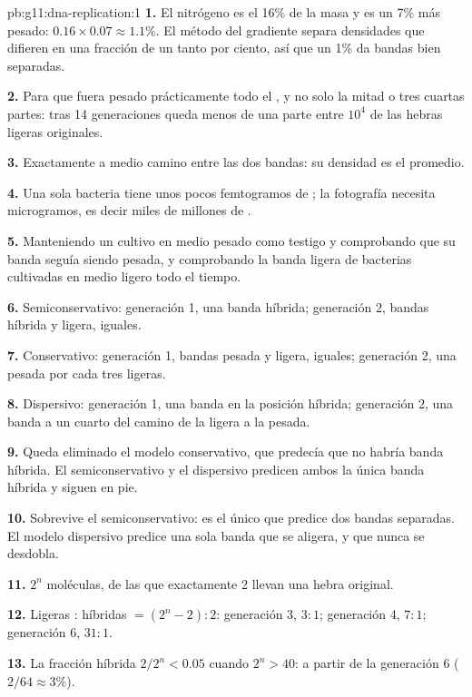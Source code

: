 \begin{solution}{pb:g11:dna-replication:1}
\textbf{1.} El nitrógeno es el 16\% de la masa y es un 7\% más pesado:
$0.16 \times 0.07 \approx 1.1\%$. El método del gradiente separa
densidades que difieren en una fracción de un tanto por ciento, así que
un 1\% da bandas bien separadas.

\textbf{2.} Para que fuera pesado prácticamente todo el , y no solo
la mitad o tres cuartas partes: tras 14 generaciones queda menos de una
parte entre $10^4$ de las hebras ligeras originales.

\textbf{3.} Exactamente a medio camino entre las dos bandas: su
densidad es el promedio.

\textbf{4.} Una sola bacteria tiene unos pocos femtogramos de ; la
fotografía necesita microgramos, es decir miles de millones de .

\textbf{5.} Manteniendo un cultivo en medio pesado como testigo y
comprobando que su banda seguía siendo pesada, y comprobando la banda
ligera de bacterias cultivadas en medio ligero todo el tiempo.

\textbf{6.} Semiconservativo: generación 1, una banda híbrida;
generación 2, bandas híbrida y ligera, iguales.

\textbf{7.} Conservativo: generación 1, bandas pesada y ligera,
iguales; generación 2, una pesada por cada tres ligeras.

\textbf{8.} Dispersivo: generación 1, una banda en la posición híbrida;
generación 2, una banda a un cuarto del camino de la ligera a la
pesada.

\textbf{9.} Queda eliminado el modelo conservativo, que predecía que no
habría banda híbrida. El semiconservativo y el dispersivo predicen
ambos la única banda híbrida y siguen en pie.

\textbf{10.} Sobrevive el semiconservativo: es el único que predice dos
bandas separadas. El modelo dispersivo predice una sola banda que se
aligera, y que nunca se desdobla.

\textbf{11.} $2^n$ moléculas, de las que exactamente 2 llevan una hebra
original.

\textbf{12.} Ligeras : híbridas $= (2^n - 2) : 2$: generación 3, $3:1$;
generación 4, $7:1$; generación 6, $31:1$.

\textbf{13.} La fracción híbrida $2/2^n < 0.05$ cuando $2^n > 40$: a
partir de la generación 6 ($2/64 \approx 3\%$).


\end{solution}
